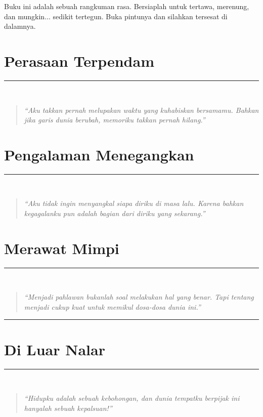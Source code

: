 \documentclass[11pt, openany, a5paper]{memoir}
\newcommand{\jedacerita}{%
  \fancybreak{\vspace{0.8em}\textasteriskcentered\quad\textasteriskcentered\quad\textasteriskcentered\vspace{0.8em}}%
}
\newcommand{\catatanpenulis}[1]{%
  \par\vspace{1.5em}%
  \noindent\rule{\linewidth}{0.2pt}\\[0.5em]%
                {\small\itshape #1}\par%
}
\begin{document}
Buku ini adalah sebuah rangkuman rasa. Bersiaplah untuk tertawa, merenung, dan mungkin$\dots$ sedikit tertegun. Buka pintunya dan silahkan tersesat di dalamnya.


\mainmatter
\pagestyle{estetis}

\chapter{Perasaan Terpendam}
\catatanpenulis{
\begin{quotation}
  \textit{``Aku takkan pernah melupakan waktu yang kuhabiskan bersamamu. Bahkan jika garis dunia berubah, memoriku takkan pernah hilang.''}
\end{quotation}}










\chapter{Pengalaman Menegangkan}
\catatanpenulis{
  \begin{quotation}
    \textit{``Aku tidak ingin menyangkal siapa diriku di masa lalu. Karena bahkan kegagalanku pun adalah bagian dari diriku yang sekarang.''}
\end{quotation}}







\chapter{Merawat Mimpi}
\catatanpenulis{
\begin{quotation}
  \textit{``Menjadi pahlawan bukanlah soal melakukan hal yang benar. Tapi tentang menjadi cukup kuat untuk memikul dosa-dosa dunia ini.''}
\end{quotation}}
\jedacerita






\chapter{Di Luar Nalar}
\catatanpenulis{
\begin{quotation}
  \textit{``Hidupku adalah sebuah kebohongan, dan dunia tempatku berpijak ini hanyalah sebuah kepalsuan!''}
\end{quotation}}





\end{document}
